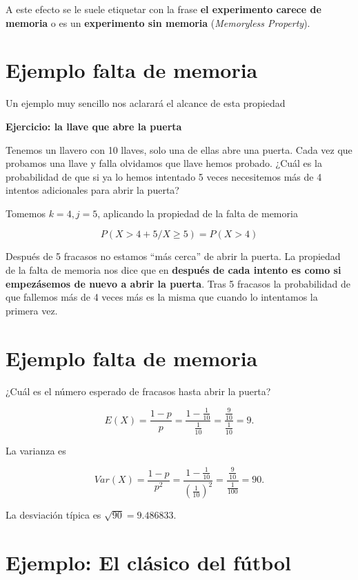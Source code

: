 \documentclass[
  letterpaper,
  DIV=11,
  numbers=noendperiod]{scrreprt}
\begin{document}
A este efecto se le suele etiquetar con la frase \textbf{el experimento
carece de memoria} o es un \textbf{experimento sin memoria}
(\emph{Memoryless Property}).

\section{Ejemplo falta de memoria}\label{ejemplo-falta-de-memoria}

Un ejemplo muy sencillo nos aclarará el alcance de esta propiedad

\textbf{Ejercicio: la llave que abre la puerta}

Tenemos un llavero con 10 llaves, solo una de ellas abre una puerta.
Cada vez que probamos una llave y falla olvidamos que llave hemos
probado. ¿Cuál es la probabilidad de que si ya lo hemos intentado 5
veces necesitemos más de 4 intentos adicionales para abrir la puerta?

Tomemos \(k=4,j=5\), aplicando la propiedad de la falta de memoria

\[
P(X> 4+5/X \geq 5)=P(X > 4)
\]

Después de 5 fracasos no estamos ``más cerca'' de abrir la puerta. La
propiedad de la falta de memoria nos dice que en \textbf{después de cada
intento es como si empezásemos de nuevo a abrir la puerta}. Tras 5
fracasos la probabilidad de que fallemos más de 4 veces más es la misma
que cuando lo intentamos la primera vez.

\section{Ejemplo falta de memoria}\label{ejemplo-falta-de-memoria-1}

¿Cuál es el número esperado de fracasos hasta abrir la puerta?

\[
E(X)=\frac{1-p}{p}=\frac{1-\frac{1}{10}}{\frac{1}{10}}=\frac{\frac{9}{10}}{\frac{1}{10}}=9.
\]

La varianza es

\[
Var(X)=\frac{1-p}{p^2}=\frac{1-\frac{1}{10}}{\left(\frac{1}{10}\right)^2}=\frac{\frac{9}{10}}{\frac{1}{100}}=
90.
\]

La desviación típica es \(\sqrt{90}=9.486833.\)

\section{Ejemplo: El clásico del
fútbol}\label{ejemplo-el-cluxe1sico-del-fuxfatbol}
\end{document}
